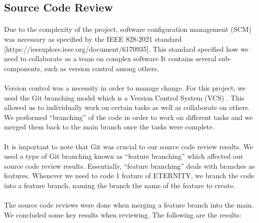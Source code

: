     \subsection{Source Code Review}
        \paragraph{}
        Due to the complexity of the project, software configuration management (SCM) was necessary as specified by the IEEE 828-2021 standard [https://ieeexplore.ieee.org/document/6170935]. This standard specified how we need to collaborate as a team on complex software It contains several sub-components, such as version control among others,

        \paragraph{}
        Version control  was a necessity in order to manage change. For this project, we used the Git branching model which is a Version Control System (VCS) . This allowed us to individually work on certain tasks as well as collaborate on others. We performed “branching” of the code in order to work on different tasks and we merged them back to the main branch once the tasks were complete.

        \paragraph{}
        It is important to note that Git was crucial to our source code review results. We used a type of Git branching known as “feature branching” which affected our source code review results. Essentially, “feature branching” deals with branches as features. Whenever we need to code 1 feature of ETERNITY, we branch the code into a feature branch, naming the branch the name of the feature to create.

        \paragraph{}
        The source code reviews were done when merging a feature branch into the main. We concluded some key results when reviewing. The following are the results:

